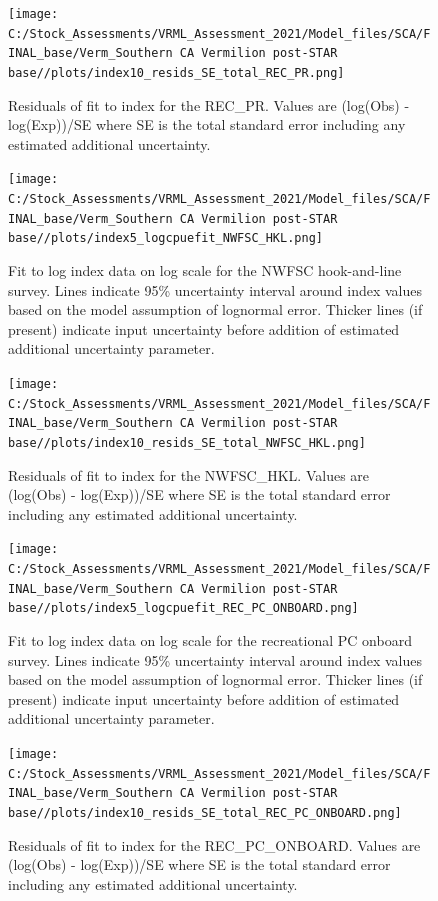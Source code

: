 \documentclass[11pt,
  english,
]{article}
\begin{document}
\begin{figure}
\centering
\texttt{[image: C:/Stock\_Assessments/VRML\_Assessment\_2021/Model\_files/SCA/FINAL\_base/Verm\_Southern CA Vermilion post-STAR base//plots/index10\_resids\_SE\_total\_REC\_PR.png]}
\caption{Residuals of fit to index for the REC\_PR. Values are (log(Obs) - log(Exp))/SE where SE is the total standard error including any estimated additional uncertainty.\label{fig:cpue-resid-REC-PR}}
\end{figure}

\begin{figure}
\centering
\texttt{[image: C:/Stock\_Assessments/VRML\_Assessment\_2021/Model\_files/SCA/FINAL\_base/Verm\_Southern CA Vermilion post-STAR base//plots/index5\_logcpuefit\_NWFSC\_HKL.png]}
\caption{Fit to log index data on log scale for the NWFSC hook-and-line survey. Lines indicate 95\% uncertainty interval around index values based on the model assumption of lognormal error. Thicker lines (if present) indicate input uncertainty before addition of estimated additional uncertainty parameter.\label{fig:log-cpue-NWFSC-HKL}}
\end{figure}

\begin{figure}
\centering
\texttt{[image: C:/Stock\_Assessments/VRML\_Assessment\_2021/Model\_files/SCA/FINAL\_base/Verm\_Southern CA Vermilion post-STAR base//plots/index10\_resids\_SE\_total\_NWFSC\_HKL.png]}
\caption{Residuals of fit to index for the NWFSC\_HKL. Values are (log(Obs) - log(Exp))/SE where SE is the total standard error including any estimated additional uncertainty.\label{fig:cpue-resid-NWFSC-HKL}}
\end{figure}

\begin{figure}
\centering
\texttt{[image: C:/Stock\_Assessments/VRML\_Assessment\_2021/Model\_files/SCA/FINAL\_base/Verm\_Southern CA Vermilion post-STAR base//plots/index5\_logcpuefit\_REC\_PC\_ONBOARD.png]}
\caption{Fit to log index data on log scale for the recreational PC onboard survey. Lines indicate 95\% uncertainty interval around index values based on the model assumption of lognormal error. Thicker lines (if present) indicate input uncertainty before addition of estimated additional uncertainty parameter.\label{fig:log-cpue-REC-PC-ONBOARD}}
\end{figure}

\begin{figure}
\centering
\texttt{[image: C:/Stock\_Assessments/VRML\_Assessment\_2021/Model\_files/SCA/FINAL\_base/Verm\_Southern CA Vermilion post-STAR base//plots/index10\_resids\_SE\_total\_REC\_PC\_ONBOARD.png]}
\caption{Residuals of fit to index for the REC\_PC\_ONBOARD. Values are (log(Obs) - log(Exp))/SE where SE is the total standard error including any estimated additional uncertainty.\label{fig:cpue-resid-REC-PC-ONBOARD}}
\end{figure}
\end{document}
